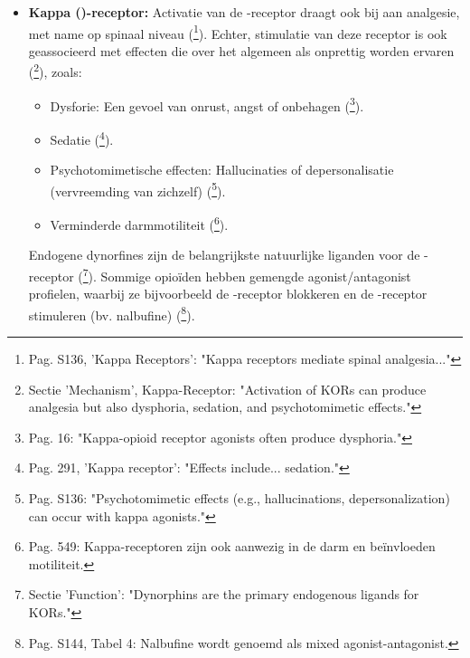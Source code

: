 \documentclass[11pt, a4paper]{report} %
\begin{document}
\begin{itemize}
\begin{itemize}
            \item Fysieke afhankelijkheid: Het ontstaan van ontwenningsverschijnselen bij staken van het middel (\cite{Kosten2002NeurobiologyDependence}\footnote{Pag. 14: "Physical dependence...is mediated primarily through MORs."}).
        \end{itemize}
        Er worden subtypes van de \textmu-receptor (bv. , ) verondersteld, die mogelijk selectief verschillende effecten mediëren (\cite{PasternakPan2013PharmacolRev}\footnote{Sectie 'Mu Opioid Receptor Subtypes': "Evidence suggests the existence of MOR subtypes, such as MOR-1 and MOR-2..."}), maar dit is nog onderwerp van onderzoek.
    \item \textbf{Kappa (\textkappa)-receptor:} Activatie van de \textkappa-receptor draagt ook bij aan analgesie, met name op spinaal niveau (\cite{Trescot2008OpioidPharm}\footnote{Pag. S136, 'Kappa Receptors': "Kappa receptors mediate spinal analgesia..."}). Echter, stimulatie van deze receptor is ook geassocieerd met effecten die over het algemeen als onprettig worden ervaren (\cite{StatPearlsOpioidReceptor}\footnote{Sectie 'Mechanism', Kappa-Receptor: "Activation of KORs can produce analgesia but also dysphoria, sedation, and psychotomimetic effects."}), zoals:
        \begin{itemize}
            \item Dysforie: Een gevoel van onrust, angst of onbehagen (\cite{Kosten2002NeurobiologyDependence}\footnote{Pag. 16: "Kappa-opioid receptor agonists often produce dysphoria."}).
            \item Sedatie (\cite{Gupta2010ChemistryOpioids}\footnote{Pag. 291, 'Kappa receptor': "Effects include... sedation."}).
            \item Psychotomimetische effecten: Hallucinaties of depersonalisatie (vervreemding van zichzelf) (\cite{Trescot2008OpioidPharm}\footnote{Pag. S136: "Psychotomimetic effects (e.g., hallucinations, depersonalization) can occur with kappa agonists."}).
            \item Verminderde darmmotiliteit (\cite{GutsteinAkil2006OpioidAnalgesics}\footnote{Pag. 549: Kappa-receptoren zijn ook aanwezig in de darm en beïnvloeden motiliteit.}).
        \end{itemize}
        Endogene dynorfines zijn de belangrijkste natuurlijke liganden voor de \textkappa-receptor (\cite{StatPearlsOpioidReceptor}\footnote{Sectie 'Function': "Dynorphins are the primary endogenous ligands for KORs."}). Sommige opioïden hebben gemengde agonist/antagonist profielen, waarbij ze bijvoorbeeld de \textmu-receptor blokkeren en de \textkappa-receptor stimuleren (bv. nalbufine) (\cite{Trescot2008OpioidPharm}\footnote{Pag. S144, Tabel 4: Nalbufine wordt genoemd als mixed agonist-antagonist.}).

\end{itemize}
\end{document}
